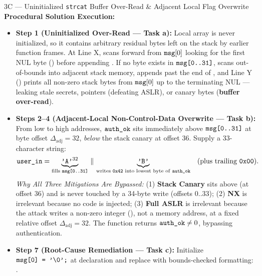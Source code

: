 \begin{templatebox}{3C --- Uninitialized \texttt{strcat} Buffer Over-Read \& Adjacent Local Flag Overwrite}
\medskip
\textbf{Procedural Solution Execution:}
\begin{itemize}
  \item \textbf{Step 1 (Uninitialized  Over-Read --- Task a):}
  Local array  is never initialized, so it contains arbitrary residual bytes left on the stack by earlier function frames. At Line X,  scans forward from $\texttt{msg}[0]$ looking for the first NUL byte () before appending . If no  byte exists in $\texttt{msg[0..31]}$,  scans out-of-bounds into adjacent stack memory, appends  past the end of , and Line Y () prints all non-zero stack bytes from $\texttt{msg}[0]$ up to the terminating NUL --- leaking stale secrets, pointers (defeating ASLR), or canary bytes (\textbf{buffer over-read}).
  \item \textbf{Steps 2--4 (Adjacent-Local Non-Control-Data Overwrite --- Task b):}
  From low to high addresses, $\texttt{auth\_ok}$ sits immediately above $\texttt{msg[0..31]}$ at byte offset $\Delta_{\text{adj}} = 32$, \emph{below} the stack canary at offset $36$. Supply a 33-character string:
  \[
    \texttt{user\_in} = \underbrace{\texttt{'A'}^{32}}_{\text{fills \texttt{msg[0..31]}}} \,\|\, \underbrace{\texttt{'B'}}_{\text{writes \texttt{0x42} into lowest byte of \texttt{auth\_ok}}} \quad (\text{plus trailing }\texttt{0x00}).
  \]
  \emph{Why All Three Mitigations Are Bypassed:} (1) \textbf{Stack Canary} sits above  (at offset $36$) and is never touched by a 34-byte write (offsets $0..33$); (2) \textbf{NX} is irrelevant because no code is injected; (3) \textbf{Full ASLR} is irrelevant because the attack writes a non-zero integer (), not a memory address, at a fixed relative offset $\Delta_{\text{adj}} = 32$. The function returns $\texttt{auth\_ok} \neq 0$, bypassing authentication.
  \item \textbf{Step 7 (Root-Cause Remediation --- Task c):}
  Initialize $\texttt{msg[0] = '\textbackslash 0';}$ at declaration and replace  with bounds-checked formatting: .
\end{itemize}
\end{templatebox}



